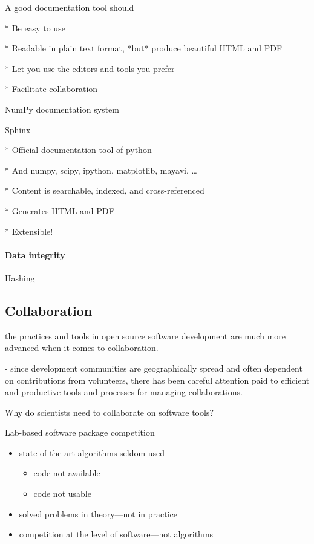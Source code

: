 \documentclass[ChapterTOCs,krantz2]{krantz} %
\begin{document}
A good documentation tool should

* Be easy to use

* Readable in plain text format, *but* produce beautiful HTML and PDF

* Let you use the editors and tools you prefer

* Facilitate collaboration

NumPy documentation system \cite{SciPyProceedings_27}

Sphinx

* Official documentation tool of python

* And numpy, scipy, ipython, matplotlib, mayavi, \ldots

* Content is searchable, indexed, and cross-referenced

* Generates HTML and PDF

* Extensible!

\paragraph{ {\bf Data integrity}}

Hashing


\subsection{Collaboration}

the practices and tools in open source software development
are much more advanced when it comes to collaboration.

- since development communities are geographically spread
and often dependent on contributions from volunteers, there
has been careful attention paid to efficient and productive
tools and processes for managing collaborations.

Why do scientists need to collaborate on software tools?

Lab-based software package competition

\begin{itemize}
\item  state-of-the-art algorithms seldom used

\begin{itemize}
\item code not available
\item code not usable
\end{itemize}

\item solved problems in theory---not in practice
\item competition at the level of software---not algorithms
\end{itemize}
\end{document}
